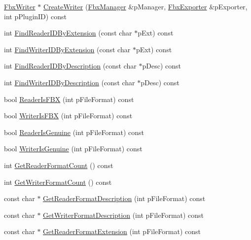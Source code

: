 \begin{DoxyCompactItemize}
\hyperlink{class_fbx_writer}{Fbx\+Writer} $\ast$ \hyperlink{class_fbx_i_o_plugin_registry_a2b713ba7dd4315e3ebdd2fecba66ac87}{Create\+Writer} (\hyperlink{class_fbx_manager}{Fbx\+Manager} \&p\+Manager, \hyperlink{class_fbx_exporter}{Fbx\+Exporter} \&p\+Exporter, int p\+Plugin\+ID) const
\item 
int \hyperlink{class_fbx_i_o_plugin_registry_a49fd69a6818279573cdab5cf86861ca3}{Find\+Reader\+I\+D\+By\+Extension} (const char $\ast$p\+Ext) const
\item 
int \hyperlink{class_fbx_i_o_plugin_registry_ad9495307df7b5dc61ceb34d940f6d619}{Find\+Writer\+I\+D\+By\+Extension} (const char $\ast$p\+Ext) const
\item 
int \hyperlink{class_fbx_i_o_plugin_registry_afe4efa15bdb7a8963b77527453222811}{Find\+Reader\+I\+D\+By\+Description} (const char $\ast$p\+Desc) const
\item 
int \hyperlink{class_fbx_i_o_plugin_registry_afb8a3db5c0234b9a275be784b75e5748}{Find\+Writer\+I\+D\+By\+Description} (const char $\ast$p\+Desc) const
\item 
bool \hyperlink{class_fbx_i_o_plugin_registry_a05eaf29eea6f7b72fd250796dd026791}{Reader\+Is\+F\+BX} (int p\+File\+Format) const
\item 
bool \hyperlink{class_fbx_i_o_plugin_registry_ab944fef5c7714d9e0996155bfbe18dc6}{Writer\+Is\+F\+BX} (int p\+File\+Format) const
\item 
bool \hyperlink{class_fbx_i_o_plugin_registry_af737d254762b26d85dab9022c4c41986}{Reader\+Is\+Genuine} (int p\+File\+Format) const
\item 
bool \hyperlink{class_fbx_i_o_plugin_registry_a97b8717732f20dff6eb8a6c8ae3b29ad}{Writer\+Is\+Genuine} (int p\+File\+Format) const
\item 
int \hyperlink{class_fbx_i_o_plugin_registry_a179517469d70cc8736339275b1e8a379}{Get\+Reader\+Format\+Count} () const
\item 
int \hyperlink{class_fbx_i_o_plugin_registry_a2699c35cb6a8c2f8abab2167b1faa8fb}{Get\+Writer\+Format\+Count} () const
\item 
const char $\ast$ \hyperlink{class_fbx_i_o_plugin_registry_a2663a4ab5c9f0726bb0196497426bf22}{Get\+Reader\+Format\+Description} (int p\+File\+Format) const
\item 
const char $\ast$ \hyperlink{class_fbx_i_o_plugin_registry_ae9b071a85a7f1738b813357b07618747}{Get\+Writer\+Format\+Description} (int p\+File\+Format) const
\item 
const char $\ast$ \hyperlink{class_fbx_i_o_plugin_registry_aa7637c8cdebd8b808487d569d2639a3e}{Get\+Reader\+Format\+Extension} (int p\+File\+Format) const

\end{DoxyCompactItemize}
